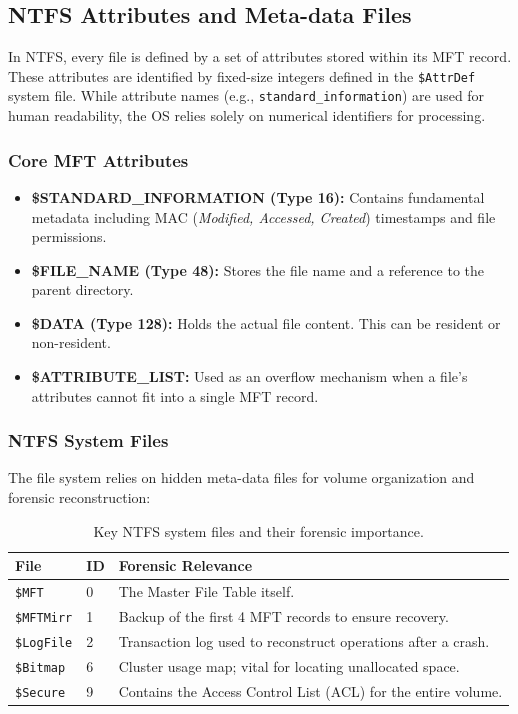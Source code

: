 \subsection{NTFS Attributes and Meta-data Files}
In NTFS, every file is defined by a set of attributes stored within its MFT record. These attributes are identified by fixed-size integers defined in the \texttt{\$AttrDef} system file. While attribute names (e.g., \texttt{standard\_information}) are used for human readability, the OS relies solely on numerical identifiers for processing.

\subsubsection*{Core MFT Attributes}
\begin{itemize}
    \item \textbf{\$STANDARD\_INFORMATION (Type 16):} Contains fundamental metadata including MAC (\textit{Modified, Accessed, Created}) timestamps and file permissions.
    \item \textbf{\$FILE\_NAME (Type 48):} Stores the file name and a reference to the parent directory.
    \item \textbf{\$DATA (Type 128):} Holds the actual file content. This can be resident or non-resident.
    \item \textbf{\$ATTRIBUTE\_LIST:} Used as an overflow mechanism when a file's attributes cannot fit into a single MFT record.
\end{itemize}

\subsubsection*{NTFS System Files}
The file system relies on hidden meta-data files for volume organization and forensic reconstruction:
\begin{table}[H]
\centering
\small
\begin{tabular}{|l|l|p{6cm}|}
\hline
\textbf{File} & \textbf{ID} & \textbf{Forensic Relevance} \\
\hline
\texttt{\$MFT} & 0 & The Master File Table itself. \\
\texttt{\$MFTMirr} & 1 & Backup of the first 4 MFT records to ensure recovery. \\
\texttt{\$LogFile} & 2 & Transaction log used to reconstruct operations after a crash. \\
\texttt{\$Bitmap} & 6 & Cluster usage map; vital for locating unallocated space. \\
\texttt{\$Secure} & 9 & Contains the Access Control List (ACL) for the entire volume. \\
\hline
\end{tabular}
\caption{Key NTFS system files and their forensic importance.}
\end{table}

